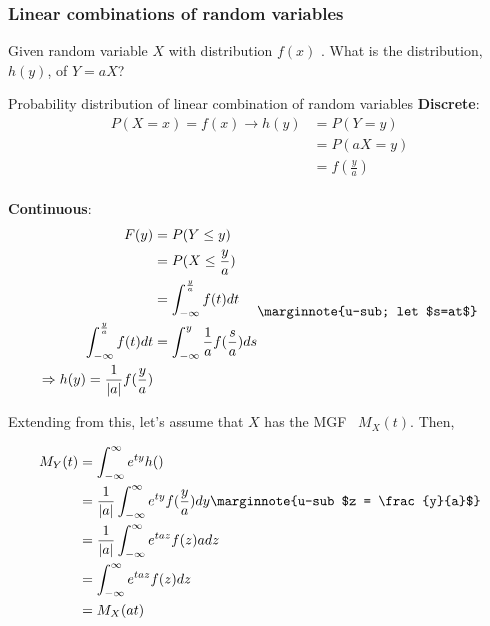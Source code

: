 \documentclass[10pt]{article}
\begin{document}
\subsubsection{Linear combinations of random variables}

Given random variable $ X $  with distribution $ f(x) $ . What is the distribution, $ h(y) $, of $ Y = aX $?


\begin{definition}
	Probability distribution of linear combination of random variables\newline
	\textbf{Discrete}:
	\begin{equation}
		\begin{split}
			P(X=x) = f(x) \rightarrow h(y) &= P(Y = y)  \\
																		 &= P(aX = y)  \\
																		 &= f(\frac{y}{a}) \\
		\end{split}
		\label{eq:286:discrete_lincomb}
	\end{equation}

	\textbf{Continuous}:
	\begin{equation}
		\begin{split}
			F(y) &= P(Y \leq y) \\
					 &= P(X \leq \frac{y}{a}) \\
					 &= \int_{-\infty}^{\frac{y}{a}} f(t) dt    \\
			\int_{-\infty}^{\frac{y}{a}} f(t) dt &= \int_{-\infty}^{y}  \frac{1}{a} f(\frac{s}{a}) ds  \\
			\Rightarrow h(y) = \frac{1}{|a|} f(\frac{y}{a})
		\end{split}
		\label{eq:286:cont_lincomb}
		\marginnote{u-sub; let $s=at$}
	\end{equation}
\end{definition}


Extending from this, let's assume that $ X $  has the MGF~ $ M_X (t) $. Then,

\begin{equation}
	\begin{split}
		M_Y (t) &= \int_{-\infty}^{\infty} e^{ty} h()  \\
						&= \frac{1}{|a| } \int_{-\infty}^{\infty} e^{ty} f(\frac{y}{a}) dy \marginnote{u-sub $z = \frac{y}{a}$} \\
						&= \frac{1}{|a| } \int_{-\infty}^{\infty} e^{taz} f(z) a dz \\
						&= \int_{-\infty}^{\infty} e^{taz} f(z) dz \\
						&=  M_X (at) \\
	\end{split}
	\label{eq:286:lin_comb_mgf}
\end{equation}
\end{document}
